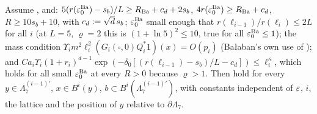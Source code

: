 \begin{lemma}\label{lem:a01:lem24}
Assume \cite[(2.55)]{Ba2}, and: $5(r(\varepsilon_0^{\mathrm{Ba}})-s_b)/L\ge R_{\mathrm{Ba}}+c_d+2s_b$, $4r(\varepsilon_0^{\mathrm{Ba}})\ge R_{\mathrm{Ba}}+c_d$, $R\ge10s_b+10$, with $c_d:=\sqrt d\,s_b$; $\varepsilon_0^{\mathrm{Ba}}$ small enough that $r(\ell_{i-1})/r(\ell_i)\le2L$ for all $i$ (at $L=5$, $\varrho=2$ this is $(1+\ln5)^2\le10$, true for all $\varepsilon_0^{\mathrm{Ba}}\le1$); the mass condition $\Upsilon_im^2\ell_i^2(G_i(\square,0)Q_i^*1)(x)=O(p_i)$ (Ba{\l}aban's own use of \cite[(2.75)]{Ba2}); and $Ca_i\Upsilon_i(1+r_i)^{d-1}\exp(-\delta_0[(r(\ell_{i-1})-s_b)/L-c_d])\le\ell_i^\kappa$, which holds for all small $\varepsilon_0^{\mathrm{Ba}}$ at every $R>0$ because $\varrho>1$. Then \cite[(2.65)--(2.66)]{Ba2} hold for every $y\in\Lambda_7^{(i-1)\prime}$, $x\in B^i(y)$, $b\subset B^i(\Lambda_7^{(i-1)\prime})$, with constants independent of $\varepsilon$, $i$, the lattice and the position of $y$ relative to $\partial\Lambda_7$.
\end{lemma}
